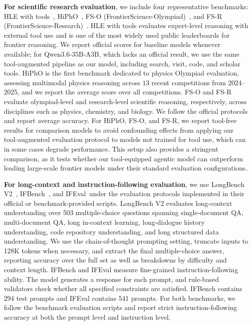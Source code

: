 \textbf{For scientific research evaluation}, we include four representative benchmarks: HLE with tools~\citep{phan2025humanity}, HiPhO~\citep{hipho}, FS-O (FrontierScience-Olympiad)~\citep{frontierscience}, and FS-R (FrontierScience-Research)~\citep{frontierscience}. HLE with tools evaluates expert-level reasoning with external tool use and is one of the most widely used public leaderboards for frontier reasoning. We report official scores for baseline models whenever available; for Qwen3.6-35B-A3B, which lacks an official result, we use the same tool-augmented pipeline as our model, including search, visit, code, and scholar tools. HiPhO is the first benchmark dedicated to physics Olympiad evaluation, assessing multimodal physics reasoning across $13$ recent competitions from 2024--2025, and we report the average score over all competitions. FS-O and FS-R evaluate olympiad-level and research-level scientific reasoning, respectively, across disciplines such as physics, chemistry, and biology. We follow the official protocols and report average accuracy. For HiPhO, FS-O, and FS-R, we report tool-free results for comparison models to avoid confounding effects from applying our tool-augmented evaluation protocol to models not trained for tool use, which can in some cases degrade performance. This setup also provides a stringent comparison, as it tests whether our tool-equipped agentic model can outperform leading large-scale frontier models under their standard evaluation configurations.

\textbf{For long-context and instruction-following evaluation}, we use LongBench V2~\citep{LongBench}, IFBench~\citep{IFBench}, and IFEval~\citep{zhou2023ifeval}under the evaluation protocols implemented in their official or benchmark-provided scripts. LongBench V2 evaluates long-context understanding over 503 multiple-choice questions spanning single-document QA, multi-document QA, long in-context learning, long-dialogue history understanding, code repository understanding, and long structured data understanding. We use the chain-of-thought prompting setting, truncate inputs to 128K tokens when necessary, and extract the final multiple-choice answer, reporting accuracy over the full set as well as breakdowns by difficulty and context length. IFBench and IFEval measure fine-grained instruction-following ability. The model generates a response for each prompt, and rule-based validators check whether all specified constraints are satisfied. IFBench contains 294 test prompts and IFEval contains 541 prompts. For both benchmarks, we follow the benchmark evaluation scripts and report strict instruction-following accuracy at both the prompt level and instruction level.

